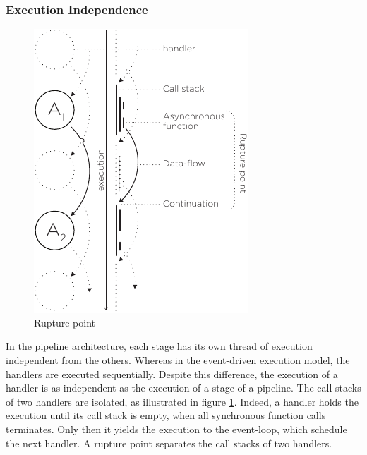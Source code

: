 \subsubsection{Execution Independence}

\begin{figure}
  \centering
  \includegraphics[height=0.5\textwidth]{../resources/rupture-point.pdf}
  \caption{Rupture point}
  \label{fig:rupture-point}
  \vspace{-40pt}
\end{figure}


In the pipeline architecture, each stage has its own thread of execution independent from the others.
Whereas in the event-driven execution model, the handlers are executed sequentially.
Despite this difference, the execution of a handler is as independent as the execution of a stage of a pipeline.
The call stacks of two handlers are isolated, as illustrated in figure \ref{fig:rupture-point}.
Indeed, a handler holds the execution until its call stack is empty, when all synchronous function calls terminates. Only then it yields the execution to the event-loop, which schedule the next handler.
A rupture point separates the call stacks of two handlers.

